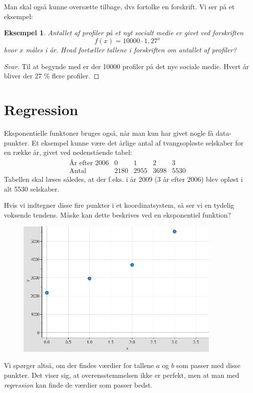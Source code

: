 \documentclass[12pt,oneside,a4paper]{article}
\newtheorem{eks}[thm]{Eksempel}
\begin{document}
Man skal også kunne oversætte tilbage, dvs fortolke en forskrift. Vi ser på et eksempel:

\begin{eks}
    Antallet af profiler på et nyt socialt medie er givet ved forskriften
    $$
    f(x) = 10000 \cdot 1,27^x
    $$
    hvor $x$ måles i år. Hvad fortæller tallene i forskriften om antallet af profiler?
\end{eks}
\begin{proof}[Svar]
    Til at begynde med er der 10000 profiler på det nye sociale medie. Hvert år bliver der 27 \% flere profiler.
\end{proof}

\section{Regression}
Eksponentielle funktoner bruges også, når man kun har givet nogle få
data-punkter. Et eksempel kunne være det årlige antal af tvangsopløste
selskaber for en række år, givet ved nedenstående tabel:
$$
\begin{array}{l|c|c|c|c}
    \mbox{År efter 2006} & 0 & 1 & 2 & 3 \\
    \hline
    \mbox{Antal} & 2180 & 2955 & 3698 & 5530
\end{array}
$$
Tabellen skal læses således, at der f.eks. i år 2009 (3 år efter 2006) blev
opløst i alt 5530 selskaber.

Hvis vi indtegner disse fire punkter i et koordinatsystem, så ser vi en tydelig
voksende tendens. Måske kan dette beskrives ved en eksponentiel funktion?

\begin{figure}[ht]
    \centering
    \includegraphics[width=10cm]{eksp-eks1}
\end{figure}

Vi spørger altså, om der findes værdier for tallene $a$ og $b$ som passer med disse punkter. Det viser sig, at overensstemmelsen ikke er perfekt, men at man med {\em regression} kan finde de værdier som passer bedst.
\end{document}
